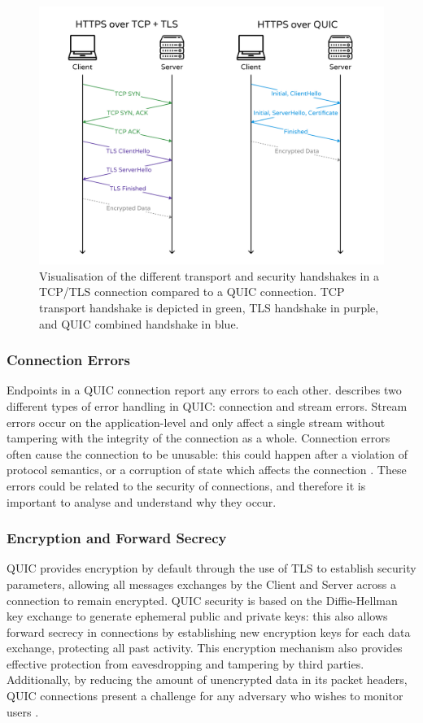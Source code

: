 \documentclass{l4proj}
\begin{document}
\begin{figure}
    \centering
    \includegraphics[width=0.75\linewidth]{images/connectionEstablishmentHandshakes.png}
    \caption{Visualisation of the different transport and security handshakes in a TCP/TLS connection compared to a QUIC connection. TCP transport handshake is depicted in green, TLS handshake in purple, and QUIC combined handshake in blue.}
    \label{fig:TCPTLSvsQUIC_handshakes}
\end{figure}


\subsubsection{Connection Errors} Endpoints in a QUIC connection report any errors to each other. \citet{Iyen2021} describes two different types of error handling in QUIC: connection and stream errors. Stream errors occur on the application-level and only affect a single stream without tampering with the integrity of the connection as a whole. Connection errors often cause the connection to be unusable: this could happen after a violation of protocol semantics, or a corruption of state which affects the connection \citep{Iyen2021}. These errors could be related to the security of connections, and therefore it is important to analyse and understand why they occur.

\subsubsection{Encryption and Forward Secrecy} QUIC provides encryption by default through the use of TLS to establish security parameters, allowing all messages exchanges by the Client and Server across a connection to remain encrypted. QUIC security is based on the Diffie-Hellman key exchange to generate ephemeral public and private keys: this also allows forward secrecy in connections by establishing new encryption keys for each data exchange, protecting all past activity. This encryption mechanism also provides effective protection from eavesdropping and tampering by third parties. Additionally, by reducing the amount of unencrypted data in its packet headers, QUIC connections present a challenge for any adversary who wishes to monitor users \citep{Liu2023}. 
\end{document}

